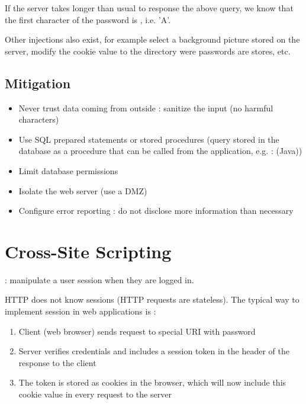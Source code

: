 
If the server takes longer than usual to response the above query, we know that the first character of the password is , i.e. 'A'.

Other injections also exist, for example select a background picture stored on the server, modify the cookie value to the directory were passwords are stores, etc.

\section{Mitigation}

\begin{itemize}
    \item Never trust data coming from outside : sanitize the input (no harmful characters)
    \item Use SQL prepared statements or stored procedures (query stored in the database as a procedure that can be called from the application, e.g. :  (Java))
    \item Limit database permissions
    \item Isolate the web server (use a DMZ)
    \item Configure error reporting : do not disclose more information than necessary
\end{itemize}

\chapter{Cross-Site Scripting}

 : manipulate a user session when they are logged in.

HTTP does not know sessions (HTTP requests are stateless). The typical way to implement session in web applications is :
\begin{enumerate}
    \item Client (web browser) sends request to special URI with password
    \item Server verifies credentials and includes a session token in the header of the response to the client
    \item The token is stored as cookies in the browser, which will now include this cookie value in every request to the server
\end{enumerate}

